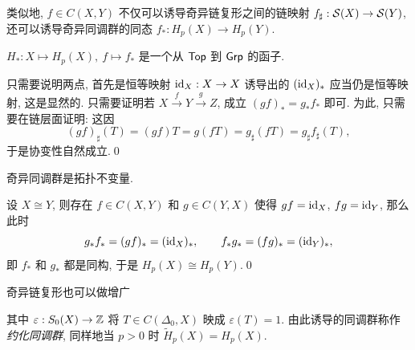 类似地, $ f\in C(X,Y) $ 不仅可以诱导奇异链复形之间的链映射 $ f_\sharp : \mathcal{S}(X)\to \mathcal{S}(Y) $, 还可以诱导奇异同调群的同态 $ f_* : H_p(X)\to H_p(Y) $.

\begin{Theorem}
	$ H_* : X\mapsto H_p(X),\ f\mapsto f_* $ 是一个从 $ \mathsf{Top} $ 到 $ \mathsf{Grp} $ 的函子.
\end{Theorem}
\begin{Proof}
	只需要说明两点, 首先是恒等映射 $ \mathrm{id}_X : X\to X $ 诱导出的 $ (\mathrm{id}_X)_* $ 应当仍是恒等映射, 这是显然的. 只需要证明若 $ X\stackrel{f}{\to}Y\stackrel{g}{\to}Z $, 成立 $ (gf)_*=g_*f_* $ 即可. 为此, 只需要在链层面证明: 这因
	\[
		(gf)_\sharp(T)=(gf)T=g(fT)=g_\sharp(fT)=g_\sharp f_\sharp(T),
	\]
	于是协变性自然成立.\qed
\end{Proof}

\begin{Corollary}
	奇异同调群是拓扑不变量.
\end{Corollary}
\begin{Proof}
	设 $ X\cong Y $, 则存在 $ f\in C(X,Y) $ 和 $ g\in C(Y,X) $ 使得 $ gf=\mathrm{id}_X $, $ fg=\mathrm{id}_Y $, 那么此时
	\[
		g_*f_*=(gf)_*=(\mathrm{id}_X)_*,\qquad f_*g_*=(fg)_*=(\mathrm{id}_Y)_*,
	\]
	即 $ f_* $ 和 $ g_* $ 都是同构, 于是 $ H_p(X)\cong H_p(Y) $.\qed
\end{Proof}

奇异链复形也可以做增广
\begin{center}
\end{center}
其中 $ \varepsilon : S_0(X)\to\mathbb{Z} $ 将 $ T\in C(\Delta_0,X) $ 映成 $ \varepsilon(T)=1 $. 由此诱导的同调群称作\emph{约化同调群}, 同样地当 $ p>0 $ 时 $ \tilde{H}_p(X)=H_p(X) $.

